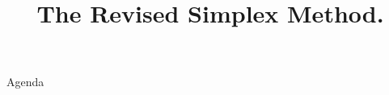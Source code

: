 \documentclass[../slides.tex]{subfiles}
\title{The Revised Simplex Method.}
\begin{document}
\begin{frame}
  \maketitle
\end{frame}


\begin{frame}{Agenda}
  \tableofcontents
\end{frame}



\begin{frame}
  \maketitle
\end{frame}
\end{document}
